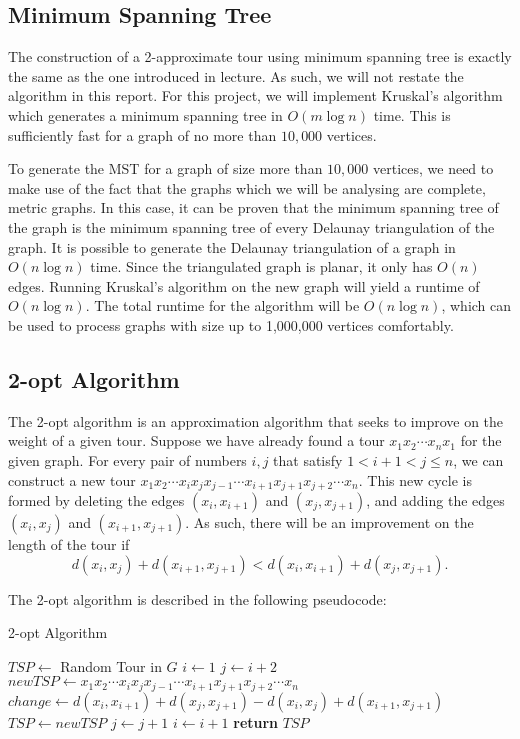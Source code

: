\documentclass[paper=a4, fontsize=11pt]{scrartcl}	%
\numberwithin{equation}{section}		%
\numberwithin{figure}{section}			%
\numberwithin{table}{section}				%
\begin{document}
\subsection{Minimum Spanning Tree}
The construction of a 2-approximate tour using minimum spanning tree is exactly the same as the one introduced in lecture. As such, we will not restate the algorithm in this report. For this project, we will implement Kruskal's algorithm which generates a minimum spanning tree in $O(m \log n)$ time. This is sufficiently fast for a graph of no more than $10,000$ vertices.

To generate the MST for a graph of size more than $10,000$ vertices, we need to make use of the fact that the graphs which we will be analysing are complete, metric graphs. In this case, it can be proven that the minimum spanning tree of the graph is the minimum spanning tree of every Delaunay triangulation of the graph.\cite{sedgewick} It is possible to generate the Delaunay triangulation of a graph in $O(n \log n)$ time. Since the triangulated graph is planar, it only has $O(n)$ edges. Running Kruskal's algorithm on the new graph will yield a runtime of $O(n \log n)$. The total runtime for the algorithm will be $O(n \log n)$, which can be used to process graphs with size up to 1,000,000 vertices comfortably.
\subsection{2-opt Algorithm} The 2-opt algorithm is an approximation algorithm that seeks to improve on the weight of a given tour. Suppose we have already found a tour $x_1x_2\cdots x_nx_1$ for the given graph. For every pair of numbers $i, j$ that satisfy $1 < i+1 < j \le n$, we can construct a new tour $x_1x_2 \cdots x_ix_jx_{j-1} \cdots x_{i+1}x_{j+1}x_{j+2} \cdots x_n$. This new cycle is formed by deleting the edges $(x_i, x_{i+1})$ and $(x_j, x_{j+1})$, and adding the edges $(x_i, x_j)$ and $(x_{i+1}, x_{j+1})$. As such, there will be an improvement on the length of the tour if 
\[d(x_i, x_j) + d(x_{i+1}, x_{j+1})< d(x_i, x_{i+1})+d(x_j, x_{j+1}).\]

The 2-opt algorithm is described in the following pseudocode:

\begin{algorithm}
\caption{2-opt Algorithm}\label{2-opt}
\begin{algorithmic}[1]
   \State $TSP \gets $ Random Tour in $G$
	\State  $i \gets 1$
	\State  $j \gets i+2$
         \State $newTSP \gets x_1x_2 \cdots x_ix_jx_{j-1} \cdots x_{i+1}x_{j+1}x_{j+2} \cdots x_n$
         \State $change \gets  d(x_i, x_{i+1})+d(x_j, x_{j+1}) - d(x_i, x_j) + d(x_{i+1}, x_{j+1})$
         	\State $TSP \gets newTSP$
         \EndIf
         \State $j \gets j+1$
         \EndWhile
\State      $i \gets i+1$
	  \EndWhile
   \EndWhile
   \State \textbf{return} $TSP$
\EndProcedure
\end{algorithmic}
\end{algorithm}
\end{document}
